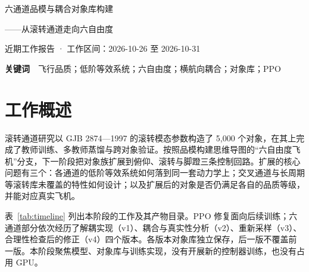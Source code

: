 \documentclass[UTF8,a4paper,11pt,fontset=fandol,scheme=plain]{ctexart}
\begin{document}
{\centering\LARGE\heiti 六通道品模与耦合对象库构建\par}
\vspace{4pt}
{\centering\large\heiti ——从滚转通道走向六自由度\par}
\vspace{6pt}
{\centering\small 近期工作报告 · 工作区间：2026-10-26 至 2026-10-31\par}
\vspace{8pt}
\begin{abstract}\noindent \textbf{摘要　}滚转通道验证了“品质相关对象族 → 特权强化学习教师 → 多轮蒸馏统一飞控控制器”的构建路线。将这条路线推广到六自由度，需要一套各通道品质等级同时成立、并且能够对应真实飞机的多通道对象。近期工作按品模构建思维导图实现了从低阶等效传递函数到动力学、再到运动学的六通道品模。依据稳定轴小扰动方程、NASA CR-2144 的 10 架飞机 94 个飞行状态以及 MIL-STD-1797A 与 GJB 2874—1997，设计了交叉通道、长周期、完整惯性耦合与 Dryden 湍流，并经三轮采样形成 v4 六通道对象库。分析表明，保持原滚转通道时横航向只剩两个自由导数；补齐交叉轴判据后，原滚转 1 级对象中仅 9\% 仍为 1 级。据此，对象库改为“模态按 GJB 等级采样、耦合形状取自真实飞机、导数由四次方程精确解出”的构造。v4 库 1/2/3 级各 1,500 个、分布外 500 个，65,536 个候选中 75.6\% 落在真实飞机导数范围内；推导得到的 \(\omega_\phi/\omega_d\) 的 5–95 百分位为 0.73–1.10，与真实飞机的 0.64–1.13 一致；45 项测试全部通过。同期修复了 PPO 实现中采样与更新概率不一致、末步重置后估值两处问题，为后续三回路教师训练准备了修复后的训练源码。\end{abstract}
\noindent \textbf{关键词}　飞行品质；低阶等效系统；六自由度；横航向耦合；对象库；PPO
\vspace{10pt}

\section{工作概述}
\label{sec:overview}
滚转通道研究以 GJB 2874—1997 的滚转模态参数构造了 5,000 个对象，在其上完成了教师训练、多教师蒸馏与跨对象验证。按照品模构建思维导图的“六自由度飞机”分支，下一阶段把对象族扩展到俯仰、滚转与脚蹬三条控制回路。扩展的核心问题有三个：各通道的低阶等效系统如何落到同一套动力学上；交叉通道与长周期等滚转库未覆盖的特性如何设计；以及扩展后的对象是否仍满足各自的品质等级，并能对应真实飞机。

表~\ref{tab:timeline} 列出本阶段的工作及其产物目录。PPO 修复面向后续训练；六通道部分依次经历了解耦实现（v1）、耦合与真实性分析（v2）、重新采样（v3）、合理性检查后的修正（v4）四个版本。各版本对象库独立保存，后一版不覆盖前一版。本阶段聚焦模型、对象库与训练实现，没有开展新的控制器训练，也没有占用 GPU。
\end{document}
